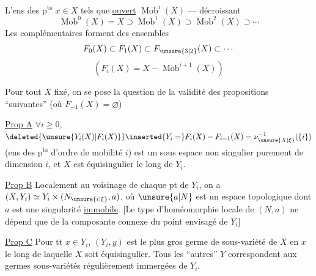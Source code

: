 L'ens des p\textsuperscript{ts} $x\in X$ tels que    \uline{ouvert}  $\operatorname{Mob}^i(X)$ ---  décroissant
\[
\operatorname{Mob}^0(X)=X\supset\operatorname{Mob}^1(X)\supset\operatorname{Mob}^2(X)\supset\cdots
\]
Les complémentaires forment des  ensembles
\[
F_0(X)\subset F_1(X)\subset F_{\unsure{3|2}}(X)\subset\cdots
\]
\[
(F_i(X)=X-\operatorname{Mob}^{i+1}(X))
\]

Pour tout $X$ fixé, on se pose la question  de la validité des propositions ``suivantes'' (où $F_{-1}(X)=\varnothing$)

\uline{Prop A} $\forall i\geq0$, $\deleted{\unsure{Y_i(X)|F_i(X)}}\inserted{Y_i=}F_i(X)-F_{i-1}(X)=\nu_{\unsure{X|\xi}}^{-1}(\{i\})$ (ens des p\textsuperscript{ts} d'ordre de mobilité $i$) est un sous espace non singulier purement de dimension $i$, et $X$ est équisingulier le long de $Y_i$.

\uline{Prop B} Localement au voisinage de chaque pt de $Y_i$, on a $(X,Y_i)\simeq Y_i\times(N_{\unsure{i|\xi}},a)$, où $\unsure{a|N}$ est un espace topologique dont $a$ est une singularité \uline{immobile}. [Le type d'homéomorphie locale de $(N,a)$ ne dépend que de la composante connexe du point envisagé de $Y_i$]

\uline{Prop C} Pour tt $x\in Y_i$, $(Y_i,y)$ est le  plus gros germe de sous-variété  de $X$ en $x$ le long de laquelle $X$ soit équisingulier. Tous les ``autres'' $Y$ correspondent  aux germes  sous-variétés régulièrement immergées de $Y_i$. 
